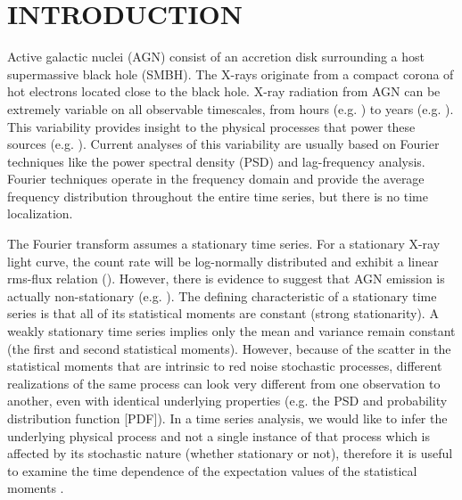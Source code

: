 \documentclass[fleqn,usenatbib]{mnras}
\begin{document}
\section{INTRODUCTION}

Active galactic nuclei (AGN) consist of an accretion disk surrounding a host supermassive black hole (SMBH).  The X-rays originate from a compact corona of hot electrons located close to the black hole.  X-ray radiation from AGN can be extremely variable on all observable timescales, from hours (e.g. \citealt{vaughan2003characterizing,paolillo2004_shorttermvar,gallo2018_shorttermvar}) to years (e.g. \citealt{markowitz2001rxte_longtermvar,gonzalezmartin2012}). This variability provides insight to the physical processes that power these sources (e.g. \citealt{vaughan2003characterizing, uttley2014}).  Current analyses of this variability are usually based on Fourier techniques like the power spectral density (PSD) and lag-frequency analysis. Fourier techniques operate in the frequency domain and provide the average frequency distribution throughout the entire time series, but there is no time localization. 

The Fourier transform assumes a stationary time series.  For a stationary X-ray light curve, the count rate will be log-normally distributed and exhibit a linear rms-flux relation (\citealt{uttley2005nonlinear,alston2019non_stationary}).  However, there is evidence to suggest that AGN emission is actually non-stationary (e.g. \citealt{gliozzi2004nonstationary, alston2019non_stationary}). The defining characteristic of a stationary time series is that all of its statistical moments are constant (strong stationarity). A weakly stationary time series implies only the mean and variance remain constant (the first and second statistical moments). However, because of the scatter in the statistical moments that are intrinsic to red noise stochastic processes, different realizations of the same process can look very different from one observation to another, even with identical underlying properties (e.g. the PSD and probability distribution function [PDF]). In a time series analysis, we would like to infer the underlying physical process and not a single instance of that process which is affected by its stochastic nature (whether stationary or not), therefore it is useful to examine the time dependence of the expectation values of the statistical moments \citep{vaughan2003characterizing}. 
\end{document}

